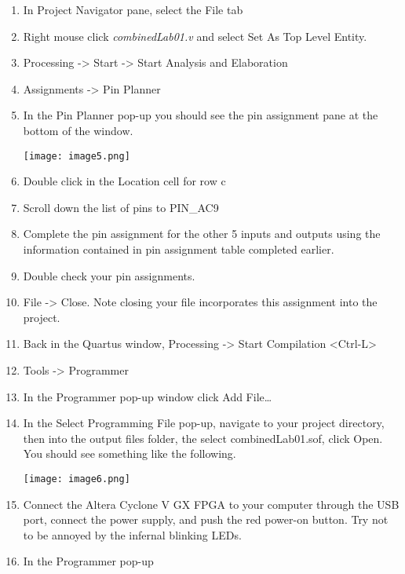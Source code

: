 \begin{enumerate}
\def\labelenumi{\arabic{enumi}.}
\item
  In Project Navigator pane, select the File tab
\item
  Right mouse click \emph{combinedLab01.v} and select Set As Top Level
  Entity.
\item
  Processing -\textgreater{} Start -\textgreater{} Start Analysis and
  Elaboration
\item
  Assignments -\textgreater{} Pin Planner
\item
  In the Pin Planner pop-up you should see the pin assignment pane at
  the bottom of the window.

\texttt{[image: image5.png]}

\item
  Double click in the Location cell for row c
\item
  Scroll down the list of pins to PIN\_AC9
\item
  Complete the pin assignment for the other 5 inputs and outputs using
  the information contained in pin assignment table completed earlier.
\item
  Double check your pin assignments.
\item
  File -\textgreater{} Close. Note closing your file incorporates this
  assignment into the project.
\item
  Back in the Quartus window, Processing -\textgreater{} Start
  Compilation \textless Ctrl-L\textgreater{}
\item
  Tools -\textgreater{} Programmer
\item
  In the Programmer pop-up window click Add File\ldots{}
\item
  In the Select Programming File pop-up, navigate to your project
  directory, then into the output files folder, the select
  combinedLab01.sof, click Open. You should see something like the
  following.
  
\texttt{[image: image6.png]}

\item
  Connect the Altera Cyclone V GX FPGA to your computer through the USB
  port, connect the power supply, and push the red power-on button. Try
  not to be annoyed by the infernal blinking LEDs.
\item
  In the Programmer pop-up


\end{enumerate}
